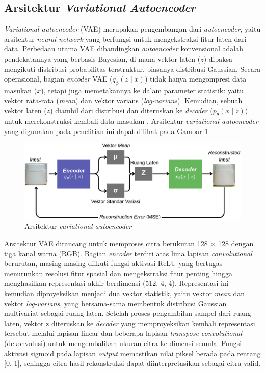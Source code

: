 \subsection{Arsitektur \textit{Variational Autoencoder}}
\noindent
\textit{Variational autoencoder} (VAE) merupakan pengembangan dari
\textit{autoencoder}, yaitu arsitektur \textit{neural network}
yang berfungsi untuk mengekstraksi fitur laten dari data. Perbedaan
utama VAE dibandingkan \textit{autoencoder} konvensional adalah
pendekatannya yang berbasis Bayesian, di mana vektor laten ($z$)
dipaksa mengikuti distribusi probabilitas terstruktur, biasanya
distribusi Gaussian. Secara operasional, bagian \textit{encoder} VAE
($q_{\phi}(z \mid x)$) tidak hanya mengompresi data masukan ($x$),
tetapi juga memetakannya ke dalam parameter statistik: yaitu vektor
rata-rata (\textit{mean}) dan vektor varians (\textit{log-varians}).
Kemudian, sebuah vektor laten ($z$) diambil dari distribusi dan
diteruskan ke \textit{decoder} ($p_{\theta}(x \mid z)$) untuk
merekonstruksi kembali data masukan \citep{25}. Arsitektur
\textit{variational autoencoder} yang
digunakan pada penelitian ini dapat dilihat pada Gambar
\ref{fig:arsitektur-autoencoder}.

\begin{figure}[H]
  \centering
  \includegraphics[width=\textwidth]{gambar/arsitektur_autoencoder.png}
  \caption{Arsitektur \textit{variational autoencoder}}
  \label{fig:arsitektur-autoencoder}
\end{figure}
\vspace{-1em}

Arsitektur VAE dirancang untuk memproses citra berukuran 128 $\times$
128 dengan tiga kanal warna (RGB). Bagian \textit{encoder}
terdiri atas lima lapisan
\textit{convolutional} berurutan, masing-masing diikuti fungsi
aktivasi ReLU yang bertugas menurunkan
resolusi fitur spasial dan mengekstraksi fitur penting hingga
menghasilkan representasi akhir berdimensi (512, 4, 4). Representasi
ini kemudian diproyeksikan menjadi dua vektor statistik, yaitu vektor
\textit{mean} dan vektor \textit{log-varians}, yang bersama-sama
membentuk distribusi
Gaussian multivariat sebagai ruang laten. Setelah proses pengambilan
sampel dari ruang laten, vektor z diteruskan ke \textit{decoder} yang
memproyeksikan kembali representasi tersebut melalui lapisan linear
dan beberapa lapisan \textit{transpose convolutional} (dekonvolusi) untuk
mengembalikan ukuran citra ke dimensi semula. Fungsi aktivasi
sigmoid pada lapisan \textit{output} memastikan nilai piksel berada pada
rentang [0, 1], sehingga citra hasil rekonstruksi dapat
diinterpretasikan sebagai citra valid.

